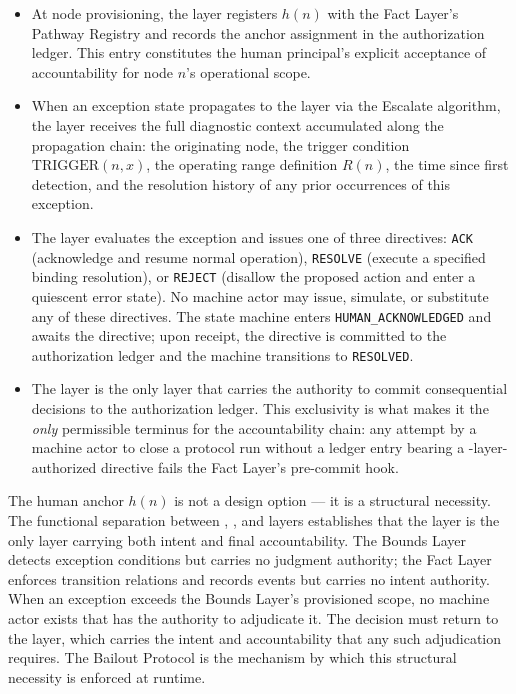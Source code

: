 \begin{itemize}\itemsep=0pt
\item[(\textit{i})] At node provisioning, the \purpose{} layer registers $h(n)$ with the Fact Layer's Pathway Registry and records the anchor assignment in the authorization ledger. This entry constitutes the human principal's explicit acceptance of accountability for node $n$'s operational scope.

\item[(\textit{ii})] When an exception state propagates to the \purpose{} layer via the Escalate algorithm, the \purpose{} layer receives the full diagnostic context accumulated along the propagation chain: the originating node, the trigger condition $\text{TRIGGER}(n, x)$, the operating range definition $R(n)$, the time since first detection, and the resolution history of any prior occurrences of this exception.

\item[(\textit{iii})] The \purpose{} layer evaluates the exception and issues one of three directives: \texttt{ACK} (acknowledge and resume normal operation), \texttt{RESOLVE} (execute a specified binding resolution), or \texttt{REJECT} (disallow the proposed action and enter a quiescent error state). No machine actor may issue, simulate, or substitute any of these directives. The state machine enters \texttt{HUMAN\_ACKNOWLEDGED} and awaits the directive; upon receipt, the directive is committed to the authorization ledger and the machine transitions to \texttt{RESOLVED}.

\item[(\textit{iv})] The \purpose{} layer is the only layer that carries the authority to commit consequential decisions to the authorization ledger. This exclusivity is what makes it the \emph{only} permissible terminus for the accountability chain: any attempt by a machine actor to close a protocol run without a ledger entry bearing a \purpose-layer-authorized directive fails the Fact Layer's pre-commit hook.
\end{itemize}

The human anchor $h(n)$ is not a design option --- it is a structural necessity. The functional separation between \purpose{}, \bounds{}, and \fact{} layers establishes that the \purpose{} layer is the only layer carrying both intent and final accountability. The Bounds Layer detects exception conditions but carries no judgment authority; the Fact Layer enforces transition relations and records events but carries no intent authority. When an exception exceeds the Bounds Layer's provisioned scope, no machine actor exists that has the authority to adjudicate it. The decision must return to the \purpose{} layer, which carries the intent and accountability that any such adjudication requires. The Bailout Protocol is the mechanism by which this structural necessity is enforced at runtime.

